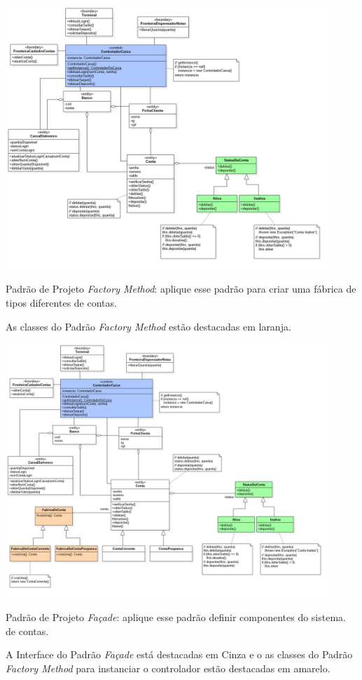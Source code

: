 \documentclass[12pt]{exam}
\begin{document}
\begin{questions}
\begin{solution}
        \includegraphics[width=0.92\textwidth]{imagens/lista2e2.jpg}
      \end{solution}
\pagebreak	
      \question Padrão de Projeto \textit{Factory Method}: aplique esse padrão para criar uma fábrica de tipos diferentes 
      de contas.
      \begin{solution}
        As classes do Padrão \textit{Factory Method} estão destacadas em laranja.
        
        \includegraphics[width=0.92\textwidth]{imagens/lista2e3.jpg}
      \end{solution}
\pagebreak      
      \question Padrão de Projeto \textit{Façade}: aplique esse padrão definir componentes do sistema. 
      de contas.
      \begin{solution}
        A Interface do Padrão \textit{Façade} está destacadas em Cinza e o as classes do Padrão \textit{Factory Method}
        para instanciar o controlador estão destacadas em amarelo.
        

\end{solution}
\end{questions}
\end{document}
